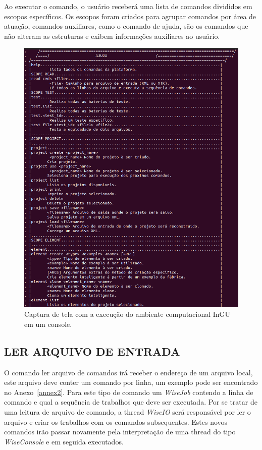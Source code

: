 Ao executar o comando, o usuário receberá uma lista de comandos divididos em escopos específicos. Os escopos foram criados para agrupar comandos por área de atuação, comandos auxiliares, como o comando de ajuda, são os comandos que não alteram as estruturas e exibem informações auxiliares ao usuário.


\begin{figure}[!htbp]
	\centering
	\includegraphics[scale=0.45]{Figures/InGU_help.png}
	\caption{Captura de tela com a execução do ambiente computacional InGU em um console.}
	\label{fig10:ajuda}
\end{figure}


\subsection{LER ARQUIVO DE ENTRADA}\label{sec:read_cmds}


O comando ler arquivo de comandos irá receber o endereço de um arquivo local, este arquivo deve conter um comando por linha, um exemplo pode ser encontrado no Anexo~\ref{annex2}. Para este tipo de comando um \textit{WiseJob} contendo a linha de comando e qual a sequência de trabalhos que deve ser executada. Por se tratar de uma leitura de arquivo de comando, a thread \textit{WiseIO} será responsável por ler o arquivo e criar os trabalhos com os comandos subsequentes. Estes novos comandos irão passar novamente pela interpretação de uma thread do tipo \textit{WiseConsole} e em seguida executados.

